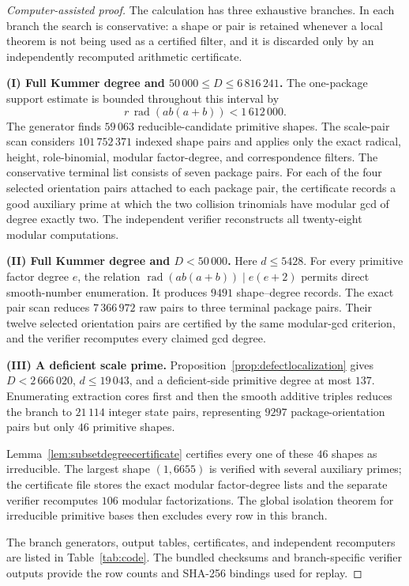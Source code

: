 \documentclass[11pt]{article}
\numberwithin{equation}{section}
\theoremstyle{definition}
\begin{document}
\begin{proof}[Computer-assisted proof]
The calculation has three exhaustive branches.  In each branch the search is
conservative: a shape or pair is retained whenever a local theorem is not
being used as a certified filter, and it is discarded only by an independently
recomputed arithmetic certificate.

\smallskip
\noindent\textbf{(I) Full Kummer degree and \(50\,000\leq D\leq6\,816\,241\).}
The one-package support estimate is bounded throughout this interval by
\[
 r\,\operatorname{rad}(ab(a+b))<1\,612\,000.
\]
The generator finds \(59\,063\) reducible-candidate primitive shapes.  The
scale-pair scan considers \(101\,752\,371\) indexed shape pairs and applies
only the exact radical, height, role-binomial, modular factor-degree, and
correspondence filters.  The conservative terminal list consists of seven
package pairs.  For each of the four selected orientation pairs attached to
each package pair, the certificate records a good auxiliary prime at which the
two collision trinomials have modular gcd of degree exactly two.  The
independent verifier reconstructs all twenty-eight modular computations.

\smallskip
\noindent\textbf{(II) Full Kummer degree and \(D<50\,000\).}
Here \(d\leq5428\).  For every primitive factor degree \(e\), the relation
\(\operatorname{rad}(ab(a+b))\mid e(e+2)\) permits direct smooth-number
enumeration.  It produces \(9491\) shape--degree records.  The exact pair scan
reduces \(7\,366\,972\) raw pairs to three terminal package pairs.  Their
twelve selected orientation pairs are certified by the same modular-gcd
criterion, and the verifier recomputes every claimed gcd degree.

\smallskip
\noindent\textbf{(III) A deficient scale prime.}
Proposition~\ref{prop:defectlocalization} gives
\(D<2\,666\,020\), \(d\leq19\,043\), and a deficient-side primitive degree
at most \(137\).  Enumerating extraction cores first and then the smooth
additive triples reduces the branch to \(21\,114\) integer state pairs,
representing \(9297\) package-orientation pairs but only \(46\) primitive
shapes.

Lemma~\ref{lem:subsetdegreecertificate} certifies every one of these
\(46\) shapes as irreducible.  The largest shape \((1,6655)\) is verified
with several auxiliary primes; the certificate file stores the exact modular
factor-degree lists and the separate verifier recomputes \(106\) modular
factorizations.  The global isolation theorem for irreducible primitive bases
then excludes every row in this branch.

The branch generators, output tables, certificates, and independent
recomputers are listed in Table~\ref{tab:code}.  The bundled checksums and
branch-specific verifier outputs provide the row counts and SHA-256 bindings
used for replay.
\end{proof}
\end{document}
